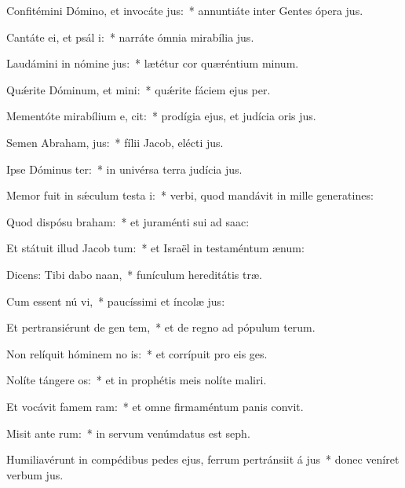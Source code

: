 \item Confitémini Dómino, et invocáte  jus:~* annuntiáte inter Gentes ópera jus.
\item Cantáte ei, et psál i:~* narráte ómnia mirabília jus.
\item Laudámini in nómine  jus:~* lætétur cor quæréntium minum.
\item Quǽrite Dóminum, et mini:~* quǽrite fáciem ejus per.
\item Mementóte mirabílium e,  cit:~* prodígia ejus, et judícia oris jus.
\item Semen Abraham,  jus:~* fílii Jacob, elécti jus.
\item Ipse Dóminus  ter:~* in univérsa terra judícia jus.
\item Memor fuit in sǽculum testa i:~* verbi, quod mandávit in mille generatines:
\item Quod dispósu  braham:~* et juraménti sui ad saac:
\item Et státuit illud Jacob  tum:~* et Israël in testaméntum ænum:
\item Dicens: Tibi dabo  naan,~* funículum hereditátis træ.
\item Cum essent nú vi,~* paucíssimi et íncolæ jus:
\item Et pertransiérunt de gen  tem,~* et de regno ad pópulum terum.
\item Non relíquit hóminem no is:~* et corrípuit pro eis ges.
\item Nolíte tángere  os:~* et in prophétis meis nolíte maliri.
\item Et vocávit famem  ram:~* et omne firmaméntum panis convit.
\item Misit ante  rum:~* in servum venúmdatus est seph.
\item Humiliavérunt in compédibus pedes ejus, ferrum pertránsiit á jus~* donec veníret verbum jus.
